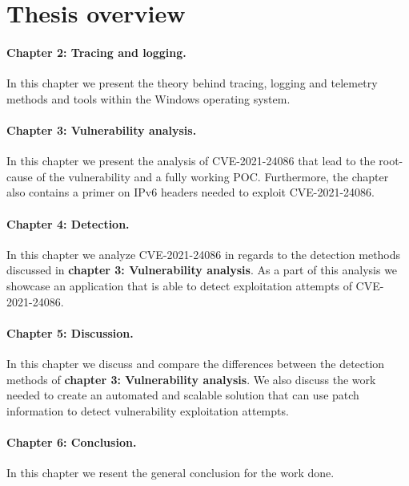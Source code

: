 \documentclass{report}
\begin{document}
\section{Thesis overview}
\paragraph{Chapter 2: Tracing and logging.} In this chapter we present the theory behind tracing, logging and telemetry methods and tools within the Windows operating system.

\paragraph{Chapter 3: Vulnerability analysis.} In this chapter we present the analysis of CVE-2021-24086 that lead to the root-cause of the vulnerability and a fully working \gls{POC}. Furthermore, the chapter also contains a primer on IPv6 headers needed to exploit CVE-2021-24086.

\paragraph{Chapter 4: Detection.} In this chapter we analyze CVE-2021-24086 in regards to the detection methods discussed in \textbf{chapter 3: Vulnerability analysis}. As a part of this analysis we showcase an application that is able to detect exploitation attempts of CVE-2021-24086.

\paragraph{Chapter 5: Discussion.} In this chapter we discuss and compare the differences between the detection methods of \textbf{chapter 3: Vulnerability analysis}. We also discuss the work needed to create an automated and scalable solution that can use patch information to detect vulnerability exploitation attempts.

\paragraph{Chapter 6: Conclusion.} In this chapter we resent the general conclusion for the work done.
\end{document}
